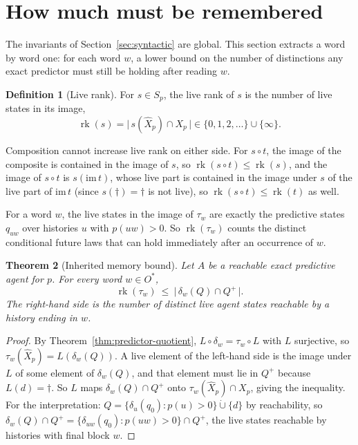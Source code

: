 \documentclass[10pt]{article}
\newtheorem{theorem}{Theorem}[section]
\theoremstyle{definition}
\newtheorem{definition}[theorem]{Definition}
\theoremstyle{remark}
\newcommand{\rk}{\operatorname{rk}}
\newcommand{\Obs}{O}
\begin{document}
\section{How much must be remembered}
\label{sec:rank}

The invariants of Section~\ref{sec:syntactic} are global.  This
section extracts a word by word one: for each word $w$, a lower bound on the number
of distinctions any exact predictor must still be holding after reading
$w$.

\begin{definition}[Live rank]
For $s\in S_p$, the live rank of $s$ is the number of live states in its
image,
\[
  \rk(s)=\bigl|\,s(\widehat X_p)\cap X_p\,\bigr|
  \in\{0,1,2,\ldots\}\cup\{\infty\}.
\]
\end{definition}

Composition cannot increase live rank on either side.  For $s\circ t$,
the image of the composite is contained in the image of $s$, so
$\rk(s\circ t)\le\rk(s)$, and the image of $s\circ t$ is
$s(\mathrm{im}\,t)$, whose live part is contained in the image under $s$
of the live part of $\mathrm{im}\,t$ (since $s(\dagger)=\dagger$ is not
live), so $\rk(s\circ t)\le\rk(t)$ as well.

For a word $w$, the live states in the image of $\tau_w$ are exactly the
predictive states $q_{uw}$ over histories $u$ with $p(uw)>0$.  So
$\rk(\tau_w)$ counts the distinct conditional future laws that can hold
immediately after an occurrence of $w$.

\begin{theorem}[Inherited memory bound]
\label{thm:rank-bound}
Let $A$ be a reachable exact predictive agent for $p$.  For every word
$w\in\Obs^*$,
\[
  \rk(\tau_w)\ \le\
  \bigl|\,\delta_w(Q)\cap Q^+\,\bigr|.
\]
The right-hand side is the number of distinct live agent states
reachable by a history ending in $w$.
\end{theorem}

\begin{proof}
By Theorem~\ref{thm:predictor-quotient},
$L\circ\delta_w=\tau_w\circ L$ with $L$ surjective, so
$\tau_w(\widehat X_p)=L(\delta_w(Q))$.  A live element of the left-hand
side is the image under $L$ of some element of $\delta_w(Q)$, and that
element must lie in $Q^+$ because $L(d)=\dagger$.  So $L$ maps
$\delta_w(Q)\cap Q^+$ onto $\tau_w(\widehat X_p)\cap X_p$, giving the
inequality.  For the interpretation: $Q=\{\delta_u(q_0):p(u)>0\}
\mathbin{\dot\cup}\{d\}$ by reachability, so
$\delta_w(Q)\cap Q^+=\{\delta_{uw}(q_0):p(uw)>0\}\cap Q^+$, the live
states reachable by histories with final block $w$.
\end{proof}
\end{document}
